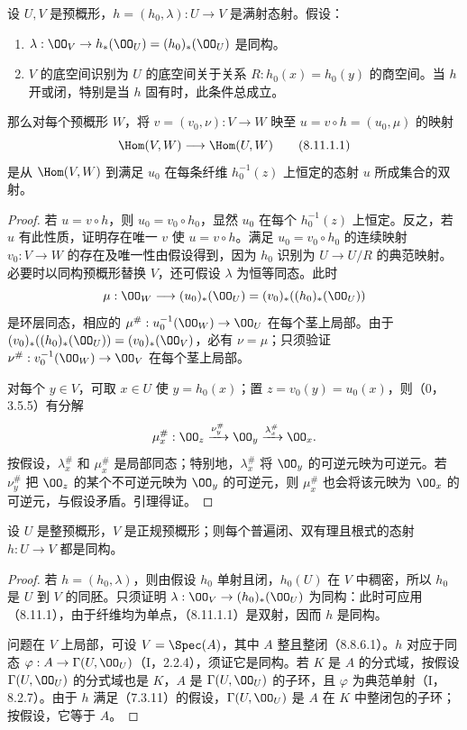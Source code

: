  设 $U,V$ 是预概形，$h=(h_0,\lambda):U\to V$ 是满射态射。假设：
\begin{enumerate}[label=\arabic*°]
\item $\lambda:\OO_V\to h_*(\OO_U)=(h_0)_*(\OO_U)$ 是同构。
\item $V$ 的底空间识别为 $U$ 的底空间关于关系 $R:h_0(x)=h_0(y)$ 的商空间。当 $h$ 开或闭，特别是当 $h$ 固有时，此条件总成立。
\end{enumerate}
那么对每个预概形 $W$，将 $v=(v_0,\nu):V\to W$ 映至 $u=v\circ h=(u_0,\mu)$ 的映射
\begin{equation}\Hom(V,W)\longrightarrow\Hom(U,W)\tag{8.11.1.1}\end{equation}
是从 $\Hom(V,W)$ 到满足 $u_0$ 在每条纤维 $h_0^{-1}(z)$ 上恒定的态射 $u$ 所成集合的双射。
\begin{proof}
若 $u=v\circ h$，则 $u_0=v_0\circ h_0$，显然 $u_0$ 在每个 $h_0^{-1}(z)$ 上恒定。反之，若 $u$ 有此性质，证明存在唯一 $v$ 使 $u=v\circ h$。满足 $u_0=v_0\circ h_0$ 的连续映射 $v_0:V\to W$ 的存在及唯一性由假设得到，因为 $h_0$ 识别为 $U\to U/R$ 的典范映射。必要时以同构预概形替换 $V$，还可假设 $\lambda$ 为恒等同态。此时
\[\mu:\OO_W\longrightarrow(u_0)_*(\OO_U)=(v_0)_*((h_0)_*(\OO_U))\]
是环层同态，相应的 $\mu^\#:u_0^{-1}(\OO_W)\to\OO_U$ 在每个茎上局部。由于 $(v_0)_*((h_0)_*(\OO_U))=(v_0)_*(\OO_V)$，必有 $\nu=\mu$；只须验证 $\nu^\#:v_0^{-1}(\OO_W)\to\OO_V$ 在每个茎上局部。

对每个 $y\in V$，可取 $x\in U$ 使 $y=h_0(x)$；置 $z=v_0(y)=u_0(x)$，则（0，3.5.5）有分解
\[\mu_x^\#:\OO_z\xrightarrow{\nu_y^\#}\OO_y\xrightarrow{\lambda_x^\#}\OO_x.\]
按假设，$\lambda_x^\#$ 和 $\mu_x^\#$ 是局部同态；特别地，$\lambda_x^\#$ 将 $\OO_y$ 的可逆元映为可逆元。若 $\nu_y^\#$ 把 $\OO_z$ 的某个不可逆元映为 $\OO_y$ 的可逆元，则 $\mu_x^\#$ 也会将该元映为 $\OO_x$ 的可逆元，与假设矛盾。引理得证。
\end{proof}

 设 $U$ 是整预概形，$V$ 是正规预概形；则每个普遍闭、双有理且根式的态射 $h:U\to V$ 都是同构。
\begin{proof}
若 $h=(h_0,\lambda)$，则由假设 $h_0$ 单射且闭，$h_0(U)$ 在 $V$ 中稠密，所以 $h_0$ 是 $U$ 到 $V$ 的同胚。只须证明 $\lambda:\OO_V\to(h_0)_*(\OO_U)$ 为同构：此时可应用（8.11.1），由于纤维均为单点，（8.11.1.1）是双射，因而 $h$ 是同构。

问题在 $V$ 上局部，可设 $V=\Spec(A)$，其中 $A$ 整且整闭（8.8.6.1）。$h$ 对应于同态 $\varphi:A\to\Gamma(U,\OO_U)$（I，2.2.4），须证它是同构。若 $K$ 是 $A$ 的分式域，按假设 $\Gamma(U,\OO_U)$ 的分式域也是 $K$，$A$ 是 $\Gamma(U,\OO_U)$ 的子环，且 $\varphi$ 为典范单射（I，8.2.7）。由于 $h$ 满足（7.3.11）的假设，$\Gamma(U,\OO_U)$ 是 $A$ 在 $K$ 中整闭包的子环；按假设，它等于 $A$。
\end{proof}

